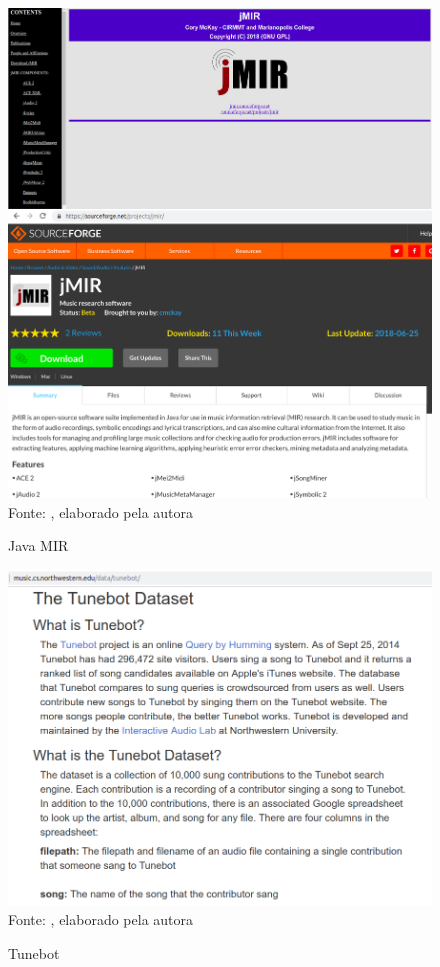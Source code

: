 \begin{figure}[!htb]
   \centering
   \caption{Java MIR}\label{fig:jmir} 
   \includegraphics[scale=0.30]{figuras/jmir.png}
   \\Fonte: \cite{jmir}, elaborado pela autora
\end{figure}

\begin{figure}[!htb]
   \centering
   \caption{Tunebot}\label{fig:tunebot} 
   \includegraphics[scale=0.45]{figuras/tunebot.png}
   \\Fonte: \cite{tunebotiOS}, elaborado pela autora
\end{figure}

